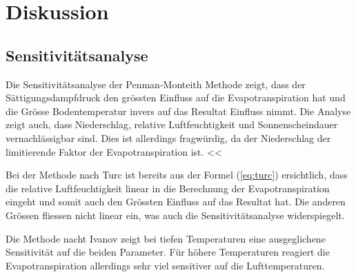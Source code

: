 \section{Diskussion}




\subsection{Sensitivitätsanalyse}
Die Sensitivitätsanalyse der Penman-Monteith Methode zeigt, dass der Sättigungsdampfdruck den grössten Einfluss auf die Evapotranspiration hat und die Grösse Bodentemperatur invers auf das Resultat Einfluss nimmt. Die Analyse zeigt auch, dass Niederschlag, relative Luftfeuchtigkeit und Sonnenscheindauer vernachlässigbar sind. Dies ist allerdings fragwürdig, da der Niederschlag der limitierende Faktor der Evapotranspiration ist. <<

Bei der Methode nach Turc ist bereits aus der Formel (\ref{eq:turc}) ersichtlich, dass die relative Luftfeuchtigkeit linear in die Berechnung der Evapotranspiration eingeht und somit auch den Grössten Einfluss auf das Resultat hat. Die anderen Grössen fliessen nicht linear ein, was auch die Sensitivitätsanalyse widerspiegelt.

Die Methode nacht Ivanov zeigt bei tiefen Temperaturen eine ausgeglichene Sensitivität auf die beiden Parameter. Für höhere Temperaturen reagiert die Evapotranspiration allerdings sehr viel sensitiver auf die Lufttemperaturen. 